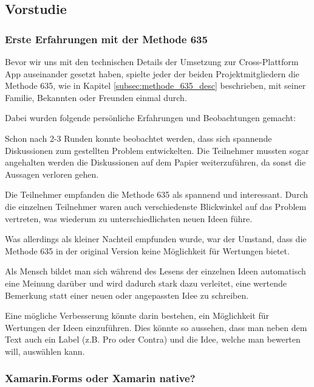 \subsection{Vorstudie}

\subsubsection{Erste Erfahrungen mit der Methode 635} \label{subsub:erste_erfahrungen_mit_methode_635}
Bevor wir uns mit den technischen Details der Umsetzung zur Cross-Plattform App auseinander gesetzt haben, spielte jeder der beiden Projektmitgliedern die Methode 635, wie in Kapitel \ref{subsec:methode_635_desc} beschrieben, mit seiner Familie, Bekannten oder Freunden einmal durch. 

Dabei wurden folgende persönliche Erfahrungen und Beobachtungen gemacht:

\begin{description}[leftmargin=!,labelwidth=\widthof{\bfseries Interessante Methode}]
	\item[Diskussion gestartet] Schon nach 2-3 Runden konnte beobachtet werden, dass sich spannende Diskussionen zum gestellten Problem entwickelten. Die Teilnehmer mussten sogar angehalten werden die Diskussionen auf dem Papier weiterzuführen, da sonst die Aussagen verloren gehen.
	\item[Interessante Methode] Die Teilnehmer empfanden die Methode 635 als spannend und interessant. Durch die einzelnen Teilnehmer waren auch verschiedenste Blickwinkel auf das Problem vertreten, was wiederum zu unterschiedlichsten neuen Ideen führe.
	\item[Wertung einführen] Was allerdings als kleiner Nachteil empfunden wurde, war der Umstand, dass die Methode 635 in der original Version keine Möglichkeit für Wertungen bietet. 
	
	Als Mensch bildet man sich während des Lesens der einzelnen Ideen automatisch eine Meinung darüber und wird dadurch stark dazu verleitet, eine wertende Bemerkung statt einer neuen oder angepassten Idee zu schreiben.
	
	Eine mögliche Verbesserung könnte darin bestehen, ein Möglichkeit für Wertungen der Ideen einzuführen. Dies könnte so aussehen, dass man neben dem Text auch ein Label (z.B. Pro oder Contra) und die Idee, welche man bewerten will, auswählen kann.
\end{description}

\subsubsection{Xamarin.Forms oder Xamarin native?}

